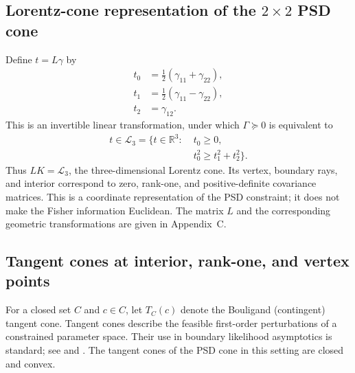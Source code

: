 \subsection{Lorentz-cone representation of the $2\times2$ PSD cone}
\label{subsec:lorentz_representation}
Define $t=L\gamma$ by
\begin{equation}\label{eq:sec4-lorentz-map}
\begin{aligned}
t_0&=\tfrac12(\gamma_{11}+\gamma_{22}),\\
t_1&=\tfrac12(\gamma_{11}-\gamma_{22}),\\
t_2&=\gamma_{12}.
\end{aligned}
\end{equation}
This is an invertible linear transformation, under which $\Gamma\succeq0$ is equivalent to
\begin{equation}\label{eq:sec4-lorentz-cone}
\begin{aligned}
t\in\mathcal L_3
=\bigl\{t\in\mathbb R^3:\;&t_0\geq0,\\
&t_0^2\geq t_1^2+t_2^2\bigr\}.
\end{aligned}
\end{equation}
Thus $LK=\mathcal L_3$, the three-dimensional Lorentz cone. Its vertex, boundary rays, and interior correspond to zero, rank-one, and positive-definite covariance matrices. This is a coordinate representation of the PSD constraint; it does not make the Fisher information Euclidean. The matrix $L$ and the corresponding geometric transformations are given in Appendix~C.


\subsection{Tangent cones at interior, rank-one,
and vertex points}
\label{subsec:tangent_cones}

For a closed set $C$ and $c\in C$, let
$T_C(c)$ denote the Bouligand (contingent)
tangent cone. Tangent cones describe the feasible first-order
perturbations of a constrained parameter space.
Their use in boundary likelihood asymptotics is
standard; see \citet{self1987asymptotic} and
\citet{shapiro1985}.
The tangent cones of the PSD cone in this
setting are closed and convex.


